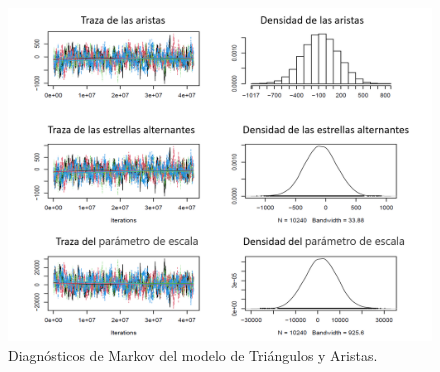 \begin{figure}[!ht]
\includegraphics[width=1\textwidth]{Tesis/Figures/mcmc3.PNG}
\caption{Diagnósticos de Markov del modelo de Triángulos y Aristas.}
\end{figure}

